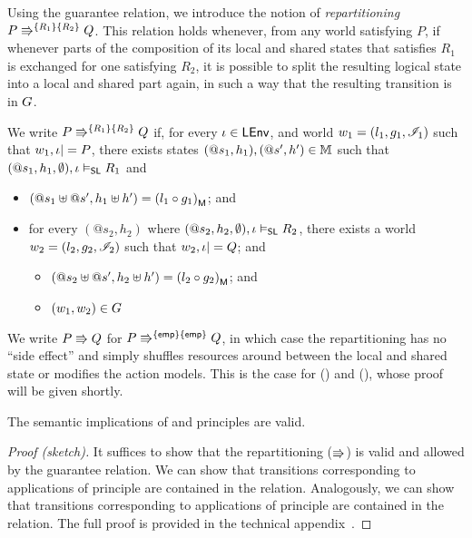 Using the guarantee relation, we introduce the notion of \emph{repartitioning} $\repartitions{P}{Q}{R_1}{R_2}$. This relation holds whenever, from any world satisfying $P$, if whenever parts of the composition of its local and shared states that satisfies $R_1$ is exchanged for one satisfying $R_2$, it is possible to split the resulting logical state into a local and shared part again, in such a way that the resulting transition is in $\guarantee$.
%
%
\begin{definition}[Repartitioning] \label{def:repartitioning}
We write $\repartitions{P}{Q}{R_1}{R_2}$ if, for every $\lenv \in \LEnv$, and world $w_1 = (l_1, g_1, \lmod_1)$ such that $w_1, \lenv |= P$, there exists states $(@s_1, h_1), (@s', h') \in \Heaps$ such that $(@s_1, h_1, \emptyset), \lenv \slsat R_1$ and
\begin{itemize} 
\item $(@s_1 \uplus @s', h_1 \uplus h') = \heapPart{\left(l_1 \composeL g_1\right)}$; and
\item for every $(@s_2, h_2)$ where $(@s_2, h_2, \emptyset), \lenv \slsat R_2$,
  there exists a world $w_2 = (l_2, g_2, \lmod_2)$ such that $w_2, \lenv |= Q$; and
  \begin{itemize}
  	\item $(@s_2 \uplus @s', h_2 \uplus h') = \heapPart{\left(l_2 \composeL g_2\right)}$; and
  	\item $(w_1, w_2) \in \guarantee$
  \end{itemize}
\end{itemize}
\end{definition}

We write $P \semimplies Q$ for $\repartitions{P}{Q}{\emp}{\emp} $, in which case the repartitioning has no ``side effect'' and simply shuffles resources around between the local and shared state or modifies the action models. This is the case for (\shiftRule) and (\extendRule), whose proof will be given shortly.
%
%
\begin{lemma}
The semantic implications of \extendRule and \shiftRule principles are valid. 
\begin{proof}[Proof (sketch)]
It suffices to show that the repartitioning ($\semimplies$) is valid and allowed by the guarantee relation. We can show that transitions corresponding to applications of \extendRule principle are contained in the \extendG relation. Analogously, we can show that transitions corresponding to applications of \shiftRule principle are contained in the \shiftRule relation. The full proof is provided in the technical appendix~\cite{colosl-tr14}.
\end{proof}
\end{lemma}
%
%
